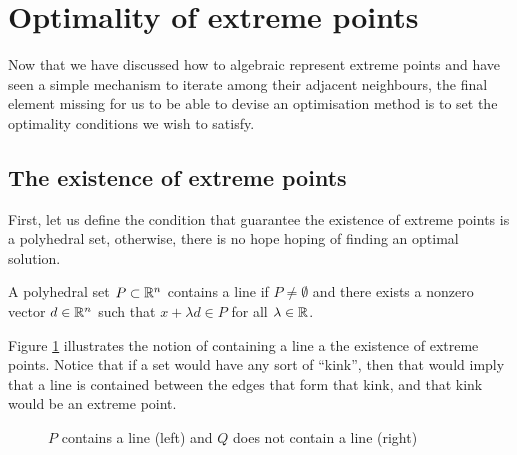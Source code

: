 \section{Optimality of extreme points}

Now that we have discussed how to algebraic represent extreme points and have seen a simple mechanism to iterate among their adjacent neighbours, the final element missing for us to be able to devise an optimisation method is to set the optimality conditions we wish to satisfy.


\subsection{The existence of extreme points}

First, let us define the condition that guarantee the existence of extreme points is a polyhedral set, otherwise, there is no hope hoping of finding an optimal solution.

\begin{definition}\label{p1c3:def:line_containing}
	A polyhedral set $P \subset \mathbb{R}^n$ contains a line if $P \neq \emptyset$ and there exists a nonzero vector $d \in \mathbb{R}^n$ such that $x + \lambda d \in P$ for all $\lambda \in \mathbb{R}$.
\end{definition}

Figure \ref{p1c3:fig:line_containing} illustrates the notion of containing a line a the existence of extreme points. Notice that if a set would have any sort of ``kink'', then that would imply that a line is contained between the edges that form that kink, and that kink would be an extreme point.

\begin{figure}
	\caption{$P$ contains a line (left) and $Q$ does not contain a line (right)} \label{p1c3:fig:line_containing}	
\end{figure}

